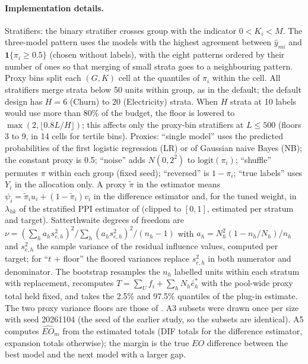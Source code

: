 \paragraph{Implementation details.} Stratifiers: the binary stratifier crosses group with the indicator $0<K_i<M$. The three-model pattern uses the models with the highest agreement between $\hat y_{mi}$ and $\mathbf 1\{\pi_i\ge 0.5\}$ (chosen without labels), with the eight patterns ordered by their number of ones so that merging of small strata goes to a neighbouring pattern. Proxy bins split each $(G,K)$ cell at the quantiles of $\pi_i$ within the cell. All stratifiers merge strata below 50 units within group, as in the default; the default design has $H=6$ (Churn) to 20 (Electricity) strata. When $H$ strata at 10 labels would use more than 80\% of the budget, the floor is lowered to $\max(2,\lfloor 0.8L/H\rfloor)$; this affects only the proxy-bin stratifiers at $L\le 500$ (floors 3 to 9, in 14 cells for tertile bins). Proxies: ``single model'' uses the predicted probabilities of the first logistic regression (LR) or of Gaussian naive Bayes (NB); the constant proxy is 0.5; ``noise'' adds $N(0,2^2)$ to $\mathrm{logit}(\pi_i)$; ``shuffle'' permutes $\pi$ within each group (fixed seed); ``reversed'' is $1-\pi_i$; ``true labels'' uses $Y_i$ in the allocation only. A proxy $\tilde\pi$ in the estimator means $\psi_i=\tilde\pi_iu_i+(1-\tilde\pi_i)v_i$ in the difference estimator and, for the tuned weight, in $\lambda_{hk}$ of the stratified PPI estimator of  (clipped to $[0,1]$, estimated per stratum and target). Satterthwaite degrees of freedom are $\nu=(\sum_h a_h s^2_{e,h})^2/\sum_h (a_h s^2_{e,h})^2/(n_h-1)$ with $a_h=N_h^2(1-n_h/N_h)/n_h$ and $s^2_{e,h}$ the sample variance of the residual influence values, computed per target; for ``$t$ + floor'' the floored variances replace $s^2_{e,h}$ in both numerator and denominator. The bootstrap resamples the $n_h$ labelled units within each stratum with replacement, recomputes $T=\sum_Uf_i+\sum_hN_h\bar e^{*}_h$ with the pool-wide proxy total held fixed, and takes the 2.5\% and 97.5\% quantiles of the plug-in estimate. The two proxy variance floors are those of . A3 subsets were drawn once per size with seed 20261104 (the seed of the earlier study, so the subsets are identical). A5 computes $\widehat{EO}_m$ from the estimated totals (DIF totals for the difference estimator, expansion totals otherwise); the margin is the true $EO$ difference between the best model and the next model with a larger gap.

